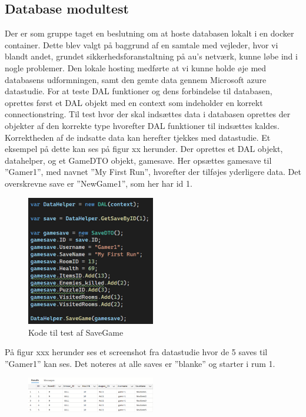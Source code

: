\subsection{Database modultest}
Der er som gruppe taget en beslutning om at hoste databasen lokalt i en docker container. Dette blev valgt på baggrund af en samtale med vejleder, hvor vi blandt andet, grundet sikkerhedsforanstaltning på au’s netværk, kunne løbe ind i nogle problemer.
Den lokale hosting medførte at vi kunne holde øje med databasens udformningen, samt den gemte data gennem Microsoft azure datastudie. \newline
For at teste DAL funktioner og dens forbindelse til databasen, oprettes først et DAL objekt med en context som indeholder en korrekt connectionstring.\newline
Til test hvor der skal indsættes data i databasen oprettes der objekter af den korrekte type hvorefter DAL funktioner til indsættes kaldes. Korrektheden af de indsatte data kan herefter tjekkes med datastudie.
\newline
Et eksempel på dette kan ses på figur xx herunder.
Der oprettes et DAL objekt, datahelper, og et GameDTO objekt, gamesave.
Her opsættes gamesave til ”Gamer1”, med navnet ”My First Run”, hvorefter der tilføjes yderligere data. Det overskrevne save er ”NewGame1”, som her har id 1.

\begin{figure}[H]
\centering
\includegraphics[width = 0.5\textwidth]{02-Body/Images/DAL-Database/NewSave.png}
\caption{Kode til test af SaveGame}
\label{fig:SaveGame-test}
\end{figure}

På figur xxx herunder ses et screenshot fra datastudie hvor de 5 saves til ”Gamer1” kan ses.
Det noteres at alle saves er ”blanke” og starter i rum 1.

\begin{figure}[H]
\centering
\includegraphics[width = 0.5\textwidth]{02-Body/Images/DAL-Database/DatastudieFørIndsættelse.png}
\caption{}
\label{fig:}
\end{figure}

